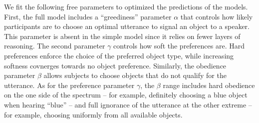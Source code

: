 \documentclass[10pt,a4paper]{article}
\begin{document}
We fit the following free parameters to optimized the predictions of the models. First, the full model includes a ``greediness'' parameter $\alpha$ that controls how likely participants are to choose an optimal utterance to signal an object to a speaker. This parameter is absent in the simple model since it relies on fewer layers of reasoning. The second parameter $\gamma$ controls how soft the preferences are. 
Hard preferences enforce the choice of the preferred object type, while increasing softness covnerges towards no object preference. 
Similarly, the obedience parameter $\beta$ allows subjects to choose objects that do not qualify for the utterance. 
As for the preference parameter $\gamma$, the $\beta$ range includes hard obedience on the one side of the spectrum -- for example, definitely choosing a blue object when hearing ``blue'' -- and full ignorance of the utterance at the other extreme -- for example, choosing uniformly from all available objects. 
\end{document}
